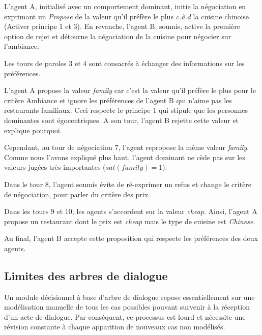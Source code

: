 				\vspace{1 em}
	\par 
	L'agent A, initialisé avec un comportement dominant, initie la négociation en exprimant un \emph{Propose} de la valeur qu'il préfère le plus \textit{c.à.d} la cuisine chinoise. (Activer principe 1 et 3). En revanche, l'agent B, soumis, active la première option de rejet et détourne la négociation de la cuisine pour négocier sur l'ambiance. 
	
	Les tours de paroles 3 et 4 sont consacrés à échanger des informations sur les préférences. 
	
	L'agent A propose la valeur \emph{family} car c'est la valeur qu'il préfère le plus pour le critère Ambiance et ignore les préférences de l'agent B qui n'aime pas les restaurants familiaux. Ceci respecte le principe 1 qui stipule que les personnes dominantes sont égocentriques. 
	A son tour, l'agent B rejette cette valeur et explique pourquoi. 
	
	Cependant, au tour de négociation 7, l'agent repropose la même valeur \emph{family}. Comme nous l'avons expliqué plus haut, l'agent dominant ne cède pas sur les valeurs jugées très importantes ($sat(family) =1$). 
	
	Dans le tour 8, l'agent soumis évite de ré-exprimer un refus et change le critère de négociation, pour parler du critère des prix.
	
	Dans les tours 9 et 10, les agents s'accordent sur la valeur \emph{cheap}. 
	Ainsi, l'agent A propose un restaurant dont le prix est \emph{cheap} mais le type de cuisine est \emph{Chinese}. 

	Au final, l'agent B accepte cette proposition qui respecte les préférences des deux agents.
	

	\subsection{Limites des arbres de dialogue}
		Un module décisionnel à base d'arbre de dialogue repose essentiellement sur une modélisation manuelle de tous les cas possibles pouvant survenir à la réception d'un acte de dialogue. Par conséquent, ce processus est lourd et nécessite une révision constante à chaque apparition de nouveaux cas non modélisés.
		
